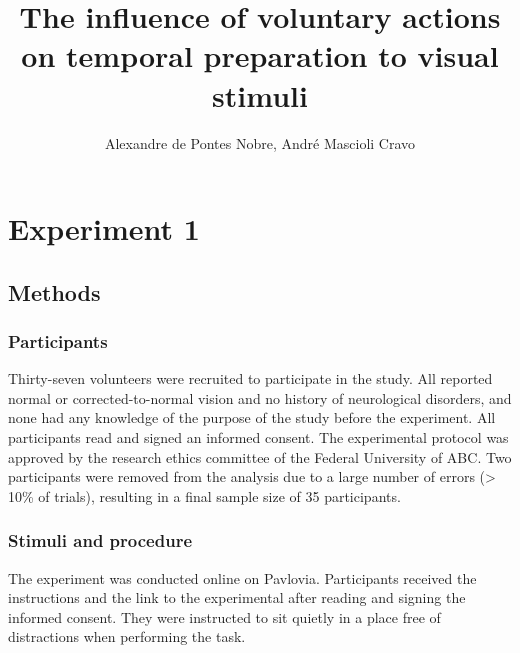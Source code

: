 \documentclass{article}
\title{The influence of voluntary actions on temporal preparation to visual stimuli}
\author{Alexandre de Pontes Nobre, André Mascioli Cravo}
\begin{document}


\maketitle

\section{Experiment 1}

\subsection{Methods}

\subsubsection{Participants}
Thirty-seven volunteers were recruited to participate in the study. All reported normal or corrected-to-normal vision and no history of neurological disorders, and none had any knowledge of the purpose of the study before the experiment. All participants read and signed an informed consent. The experimental protocol was approved by the research ethics committee of the Federal University of ABC. Two participants were removed from the analysis due to a large number of errors (> 10\% of trials), resulting in a final sample size of 35 participants.


\subsubsection{Stimuli and procedure}
The experiment was conducted online on Pavlovia. Participants received the instructions and the link to the experimental after reading and signing the informed consent. They were instructed to sit quietly in a place free of distractions when performing the task.
\end{document}
